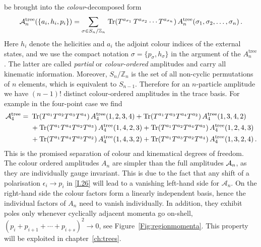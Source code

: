 be brought into the \emph{colour}-decomposed form 
%
\begin{align}
\label{I.26}
\cA_{n}^{\text{tree}}(\{ a_{i}, h_{i},p_{i}\}) %
=  %
\sum_{\sigma\in S_{n}/\mathbb{Z}_{n}}\, %
\Tr(T^{a_{\sigma_{1}}}\,  T^{a_{\sigma_{2}}}\cdots T^{a_{\sigma_{n}}} )\, 
A_{n}^{\text{tree}}({\sigma_{1}}, {\sigma_{2}}, 
\ldots , \sigma_{n}) \, .
\end{align}
%
Here $h_{i}$ denote the helicities and $a_{i}$ the adjoint colour indices of the external states, 
and we use the compact notation $\sigma = \{p_{\sigma},h_{\sigma}\}$ in the argument of the $A_{n}^{\text{tree}}$. 
The latter are called \emph{partial} or \emph{colour-ordered} amplitudes
and carry all kinematic information. 
Moreover, $S_{n}/\mathbb{Z}_{n}$ is the set of all non-cyclic permutations of $n$ elements, which is
equivalent to $S_{n-1}$. Therefore for an $n$-particle amplitude
we have $(n-1)!$ distinct colour-ordered amplitudes in the
trace basis.
For example in the four-point case we find
%
\begin{align}
\begin{aligned}
\mathcal{A}_{4}^{\text{tree}}
= \ & 
\mathop{\mathrm{Tr}}(T^{a_{1}} T^{a_{2}} T^{a_{3}} T^{a_{4}} )\, A_{4}^{\text{tree}}(1,2,3,4) +
\mathop{\mathrm{Tr}}(T^{a_{1}} T^{a_{3}} T^{a_{4}} T^{a_{2}} )\, A_{4}^{\text{tree}}(1,3,4,2)  \\ 
& + \mathop{\mathrm{Tr}}(T^{a_{1}} T^{a_{4}} T^{a_{2}} T^{a_{3}} )\, A_{4}^{\text{tree}}(1,4,2,3)+
\mathop{\mathrm{Tr}}(T^{a_{1}}  T^{a_{2}} T^{a_{4}} T^{a_{3}} )\, A_{4}^{\text{tree}}(1,2,4,3)  \\ 
& + \mathop{\mathrm{Tr}}(T^{a_{1}} T^{a_{4}} T^{a_{3}} T^{a_{2}} )\, A_{4}^{\text{tree}}(1,4,3,2) +
\mathop{\mathrm{Tr}}(T^{a_{1}} T^{a_{3}} T^{a_{2}} T^{a_{4}} )\, A_{4}^{\text{tree}}(1,3,2,4) \, .
\end{aligned}
\end{align}
%
This is the promised separation of colour and kinematical degrees of freedom.
The colour ordered amplitudes $A_{n}$ are simpler than the full amplitudes $\mathcal{A}_{n}$, 
as they are individually gauge invariant. This is due to the fact that any shift 
of a polarisation $\epsilon_{i}\to p_{i}$ in \eqref{I.26} will lead to a vanishing
left-hand side for $\mathcal{A}_{n}$. On the right-hand side the colour factors form a linearly independent basis, hence the individual factors of $A_{n}$ need to vanish
individually. In addition, they
exhibit poles only whenever cyclically adjacent momenta go on-shell,
$(p_{i}+p_{i+1}+\cdots + p_{i+s})^{2}\to 0$, see 
Figure~\ref{Fig:regionmomenta}. This property will be exploited in chapter~\ref{ch:trees}.

